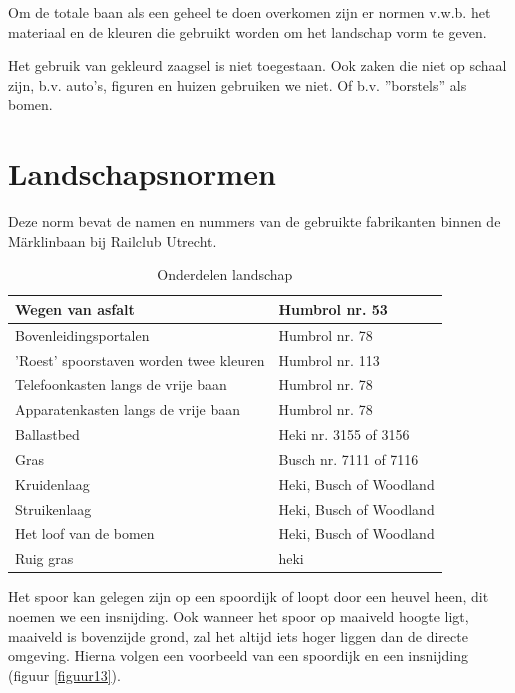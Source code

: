 \documentclass[12pt,a4paper]{report}
\begin{document}
Om de totale baan als een geheel te doen overkomen zijn er normen v.w.b. het materiaal en de kleuren die gebruikt worden om het landschap vorm te geven.

Het gebruik van gekleurd zaagsel is niet toegestaan. Ook zaken die niet op schaal zijn, b.v. auto's, figuren en huizen gebruiken we niet. Of b.v. ''borstels'' als bomen.

\section{Landschapsnormen}

Deze norm bevat de namen en nummers van de gebruikte fabrikanten binnen de M\"{a}rklinbaan bij Railclub Utrecht.

\begin{table}[h!]
\begin{tabular}{| l | l |}
\hline
\cellcolor[gray]{0.84}Wegen van asfalt&Humbrol nr. 53\\
\hline
\cellcolor[gray]{0.84}Bovenleidingsportalen&Humbrol nr. 78\\
\hline
\cellcolor[gray]{0.84}'Roest' spoorstaven  worden twee kleuren&Humbrol nr. 113\\
\hline
\cellcolor[gray]{0.84}Telefoonkasten langs de vrije baan&Humbrol nr. 78\\
\hline
\cellcolor[gray]{0.84}Apparatenkasten langs de vrije baan&Humbrol nr. 78\\
\hline
\cellcolor[gray]{0.84}Ballastbed&Heki nr. 3155 of 3156\\
\hline
\cellcolor[gray]{0.84}Gras&Busch nr. 7111 of 7116\\
\hline
\cellcolor[gray]{0.84}Kruidenlaag&Heki, Busch of Woodland\\
\hline
\cellcolor[gray]{0.84}Struikenlaag&Heki, Busch of Woodland\\
\hline
\cellcolor[gray]{0.84}Het loof van de bomen&Heki, Busch of Woodland\\
\hline
\cellcolor[gray]{0.84}Ruig gras&heki\\
\hline
\end{tabular}
\caption{Onderdelen landschap}
\end{table}

Het spoor kan gelegen zijn op een spoordijk of loopt door een heuvel heen, dit noemen we een insnijding. Ook wanneer het spoor op maaiveld hoogte ligt, maaiveld is bovenzijde grond, zal het altijd iets hoger liggen dan de directe omgeving. Hierna volgen een voorbeeld van een spoordijk en een insnijding (figuur \ref{figuur13}).
\end{document}
